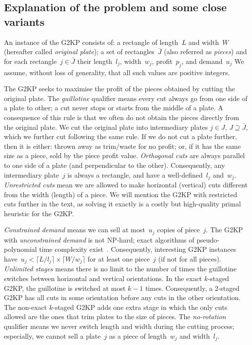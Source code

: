 \documentclass[smallextended]{svjour3}       %
\begin{document}
\subsection{Explanation of the problem and some close variants}

An instance of the G2KP consists of: a rectangle of length~\(L\) and width~\(W\) (hereafter called \emph{original plate}); a set of rectangles~\(\bar{J}\) (also referred as \emph{pieces}) and for each rectangle~\(j \in \bar{J}\) their length~\(l_j\), width~\(w_j\), profit~\(p_j\), and demand~\(u_j\)
We assume, without loss of generality, that all such values are positive integers.

The G2KP seeks to maximise the profit of the pieces obtained by cutting the original plate.
The \emph{guillotine} qualifier means every cut always go from one side of a plate to other; a cut never stops or starts from the middle of a plate.
A consequence of this rule is that we often do not obtain the pieces directly from the original plate.
We cut the original plate into intermediary plates \(j \in J\), \(J \supseteq \bar{J}\), which we further cut following the same rule.
If we do not cut a plate further, then it is either: thrown away as trim/waste for no profit; or, if it has the same size as a piece, sold by the piece profit value.
\emph{Orthogonal cuts} are always parallel to one side of a plate (and perpendicular to the other).
Consequently, any intermediary plate~\(j\) is always a rectangle, and have a well-defined~\(l_j\) and~\(w_j\).
\emph{Unrestricted cuts} mean we are allowed to make horizontal (vertical) cuts different from the width (length) of a piece.
We will mention the G2KP with restricted cuts further in the text, as solving it exactly is a costly but high-quality primal heuristic for the G2KP.

\emph{Constrained demand} means we can sell at most~\(u_j\) copies of piece~\(j\).
The G2KP with \emph{unconstrained demand} is not NP-hard; exact algorithms of pseudo-polynomial time complexity exist~\cite{beasley:1985}.
Consequently, interesting G2KP instances have~\(u_j < \lceil L / l_j \rceil \times \lceil W / w_j \rceil \) for at least one piece~\(j\) (if not for all pieces).
\emph{Unlimited stages} means there is no limit to the number of times the guillotine switches between horizontal and vertical orientations.
In the exact \(k\)-staged G2KP, the guillotine is switched at most \(k-1\) times.
Consequently, a 2-staged G2KP has all cuts in some orientation before any cuts in the other orientation.
The non-exact \(k\)-staged G2KP adds one extra stage in which the only cuts allowed are the ones that trim plates to the size of pieces.
The \emph{no-rotation} qualifier means we never switch length and width during the cutting process; especially, we cannot sell a plate~\(j\) as a piece of length~\(w_j\) and width~\(l_j\).
\end{document}
